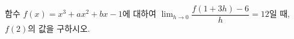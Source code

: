 함수 $f(x)=x^3+ax^2+bx-1$에 대하여 $\displaystyle\lim_{h\to 0}\dfrac{f(1+3h)-6}{h}=12$일 때, $f(2)$의 값을 구하시오. 
